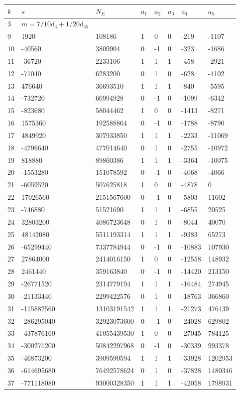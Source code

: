 \documentclass{amsart}
\begin{document}
\begin{longtable}{|l|l|l|lllll|}
\hline
$k$ & $s$ & $N_E$ & $a_1$ & $a_2$ & $a_3$ & $a_4$ & $a_5$\\
\hline
3&$m=7/10d_{3}+1/20d_{35}$&&\multicolumn{5}{c|}{}\\
9&1920&108186&1&0&0&-219&-1107\\
10&-40560&3809904&0&-1&0&-323&-1686\\
11&-36720&2233106&1&1&1&-458&-2921\\
12&-71040&6283200&0&1&0&-628&-4102\\
13&476640&36693510&1&1&1&-840&-5595\\
14&-732720&66994928&0&-1&0&-1099&-6342\\
15&-823680&58044462&1&0&0&-1413&-8271\\
16&1575360&192588864&0&-1&0&-1788&-8790\\
17&4849920&307933850&1&1&1&-2233&-11069\\
18&-4796640&477014640&0&1&0&-2755&-10972\\
19&818880&89860386&1&1&1&-3364&-10075\\
20&-1553280&151078592&0&-1&0&-4068&-4066\\
21&-6059520&507625818&1&0&0&-4878&0\\
22&17026560&2151567600&0&-1&0&-5803&11602\\
23&-746880&51521690&1&1&1&-6855&20525\\
24&32803200&4086723648&0&1&0&-8044&40070\\
25&48142080&5511193314&1&1&1&-9383&65273\\
26&-65299440&7337784944&0&-1&0&-10883&107930\\
27&27864000&2414016150&1&0&0&-12558&148932\\
28&2461440&359163840&0&-1&0&-14420&213150\\
29&-26771520&2314779194&1&1&1&-16484&274945\\
30&-21133440&2299422576&0&1&0&-18763&366860\\
31&-115882560&13103191542&1&1&1&-21273&476439\\
32&-286295040&32923073600&0&-1&0&-24028&629802\\
33&-437876160&41055439530&1&0&0&-27045&784125\\
34&-300271200&50842297968&0&-1&0&-30339&993378\\
35&-46873200&3909590594&1&1&1&-33928&1202953\\
36&-614695680&76492578624&0&1&0&-37828&1480346\\
37&-771118080&93000328350&1&1&1&-42058&1798931\\

\end{longtable}
\end{document}
